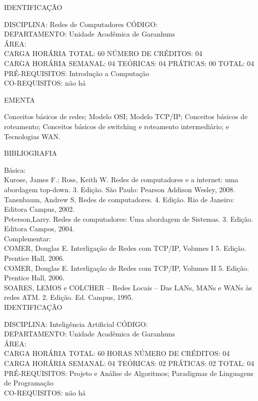 \documentclass[
	12pt,				%
	openright,			%
  oneside,     %
	a4paper,			%
	chapter=TITLE,		%
	english,			%
	french,				%
	spanish,			%
	brazil				%
	]{abntex2}
\begin{document}
\begin{apendicesenv}
\newpage IDENTIFICAÇÃO

DISCIPLINA: Redes de Computadores CÓDIGO:\\ 
DEPARTAMENTO: Unidade Acadêmica de Garanhuns\\
ÁREA: \\
CARGA HORÁRIA TOTAL: 60 NÚMERO DE CRÉDITOS: 04\\
CARGA HORÁRIA SEMANAL: 04 TEÓRICAS: 04 PRÁTICAS: 00 TOTAL: 04\\
PRÉ-REQUISITOS: Introdução a Computação\\
CO-REQUISITOS: não há

EMENTA 

Conceitos básicos de redes; Modelo OSI; Modelo TCP/IP; Conceitos básicos
de roteamento; Conceitos básicos de switching e roteamento
intermediário; e Tecnologias WAN.

BIBLIOGRAFIA 

Básica:\\
Kurose, James F.; Ross, Keith W. Redes de computadores e a internet: uma
abordagem top-down. 3. Edição. São Paulo: Pearson Addison Wesley, 2008.\\
Tanenbaum, Andrew S. Redes de computadores. 4. Edição. Rio de Janeiro:
Editora Campus, 2002.\\
Peterson,Larry. Redes de computadores: Uma abordagem de Sistemas. 3.
Edição. Editora Campos, 2004.\\
Complementar:\\
COMER, Douglas E. Interligação de Redes com TCP/IP, Volumes I 5. Edição.
Prentice Hall, 2006.\\
COMER, Douglas E. Interligação de Redes com TCP/IP, Volumes II 5.
Edição. Prentice Hall, 2006.\\
SOARES, LEMOS e COLCHER -- Redes Locais -- Das LANs, MANs e WANs às
redes ATM. 2. Edição. Ed. Campus, 1995.\\

\newpage IDENTIFICAÇÃO

DISCIPLINA: Inteligência Artificial CÓDIGO:\\ 
DEPARTAMENTO: Unidade Acadêmica de Garanhuns\\
ÁREA: \\
CARGA HORÁRIA TOTAL: 60 HORAS NÚMERO DE CRÉDITOS: 04\\
CARGA HORÁRIA SEMANAL: 04 TEÓRICAS: 02 PRÁTICAS: 02 TOTAL: 04\\
PRÉ-REQUISITOS: Projeto e Análise de Algoritmos; Paradigmas de Linguagens de Programação\\
CO-REQUISITOS: não há


\end{apendicesenv}
\end{document}
